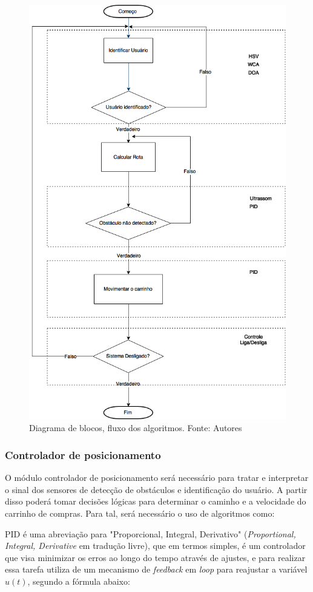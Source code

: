 \begin{figure}[ht]
	\centering
	\includegraphics[width=.7\textwidth]{figuras/DiagramaAlgoritimos.png}
	\caption{Diagrama de blocos, fluxo dos algoritmos. Fonte: Autores}
	\label{fig:diagramaAlg}
\end{figure} 
    
\subsubsection{Controlador de posicionamento}

\par O módulo controlador de posicionamento será necessário para tratar e interpretar o sinal dos sensores de detecção de obstáculos e identificação do usuário. A partir disso poderá tomar decisões lógicas para determinar o caminho e a velocidade do carrinho de compras. Para tal, será necessário o uso de algoritmos como:


	\par PID é uma abreviação para "Proporcional, Integral, Derivativo" (\textit{Proportional, Integral, Derivative} em tradução livre), que em termos simples, é um controlador que visa minimizar os erros ao longo do tempo através de ajustes, e para realizar essa tarefa utiliza de um mecanismo de \textit{feedback} em \textit{loop} para reajustar a variável $u(t)$, segundo a fórmula abaixo: 

